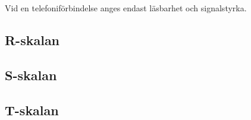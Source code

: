 Vid en telefoniförbindelse anges endast
läsbarhet och signalstyrka.

\subsection{R-skalan}

\subsection{S-skalan}

\subsection{T-skalan}

